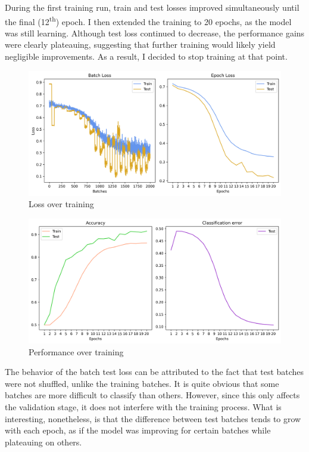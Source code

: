 \documentclass{article}
\begin{document}
During the first training run, train and test losses improved simultaneously until the final (12\textsuperscript{th}) epoch. I then extended the training to 20 epochs, as the model was still learning. Although test loss continued to decrease, the performance gains were clearly plateauing, suggesting that further training would likely yield negligible improvements. As a result, I decided to stop training at that point.

\begin{figure}
  \centering
  \includegraphics[width=\textwidth]{RoBERTa_learning_curves_1}
  \caption{Loss over training}
  \label{fig:roberta-learning-1}
\end{figure}

\begin{figure}
  \centering
  \includegraphics[width=\textwidth]{RoBERTa_learning_curves_2}
  \caption{Performance over training}
  \label{fig:roberta-learning-2}
\end{figure}

The behavior of the batch test loss can be attributed to the fact that test batches were not shuffled, unlike the training batches. It is quite obvious that some batches are more difficult to classify than others. However, since this only affects the validation stage, it does not interfere with the training process. What is interesting, nonetheless, is that the difference between test batches tends to grow with each epoch, as if the model was improving for certain batches while plateauing on others.
\end{document}
